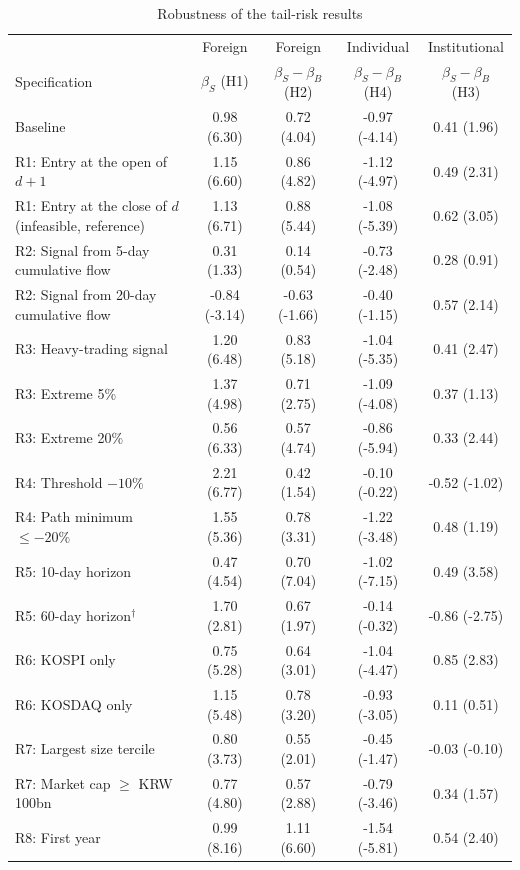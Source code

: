 \begin{table}[htbp]\centering
\caption{Robustness of the tail-risk results}\label{tab:robust}
\scriptsize
\begin{tabular}{lcccc}\toprule
 & Foreign & Foreign & Individual & Institutional \\
Specification & $\beta_S$ (H1) & $\beta_S-\beta_B$ (H2) & $\beta_S-\beta_B$ (H4) & $\beta_S-\beta_B$ (H3) \\\midrule
Baseline & 0.98 (6.30) & 0.72 (4.04) & -0.97 (-4.14) & 0.41 (1.96) \\
\midrule
R1: Entry at the open of $d+1$ & 1.15 (6.60) & 0.86 (4.82) & -1.12 (-4.97) & 0.49 (2.31) \\
R1: Entry at the close of $d$ (infeasible, reference) & 1.13 (6.71) & 0.88 (5.44) & -1.08 (-5.39) & 0.62 (3.05) \\
R2: Signal from 5-day cumulative flow & 0.31 (1.33) & 0.14 (0.54) & -0.73 (-2.48) & 0.28 (0.91) \\
R2: Signal from 20-day cumulative flow & -0.84 (-3.14) & -0.63 (-1.66) & -0.40 (-1.15) & 0.57 (2.14) \\
R3: Heavy-trading signal & 1.20 (6.48) & 0.83 (5.18) & -1.04 (-5.35) & 0.41 (2.47) \\
R3: Extreme 5\% & 1.37 (4.98) & 0.71 (2.75) & -1.09 (-4.08) & 0.37 (1.13) \\
R3: Extreme 20\% & 0.56 (6.33) & 0.57 (4.74) & -0.86 (-5.94) & 0.33 (2.44) \\
R4: Threshold $-10\%$ & 2.21 (6.77) & 0.42 (1.54) & -0.10 (-0.22) & -0.52 (-1.02) \\
R4: Path minimum $\le -20\%$ & 1.55 (5.36) & 0.78 (3.31) & -1.22 (-3.48) & 0.48 (1.19) \\
R5: 10-day horizon & 0.47 (4.54) & 0.70 (7.04) & -1.02 (-7.15) & 0.49 (3.58) \\
R5: 60-day horizon$^\dagger$ & 1.70 (2.81) & 0.67 (1.97) & -0.14 (-0.32) & -0.86 (-2.75) \\
R6: KOSPI only & 0.75 (5.28) & 0.64 (3.01) & -1.04 (-4.47) & 0.85 (2.83) \\
R6: KOSDAQ only & 1.15 (5.48) & 0.78 (3.20) & -0.93 (-3.05) & 0.11 (0.51) \\
R7: Largest size tercile & 0.80 (3.73) & 0.55 (2.01) & -0.45 (-1.47) & -0.03 (-0.10) \\
R7: Market cap $\ge$ KRW 100bn & 0.77 (4.80) & 0.57 (2.88) & -0.79 (-3.46) & 0.34 (1.57) \\
R8: First year & 0.99 (8.16) & 1.11 (6.60) & -1.54 (-5.81) & 0.54 (2.40) \\

\end{tabular}
\end{table}
